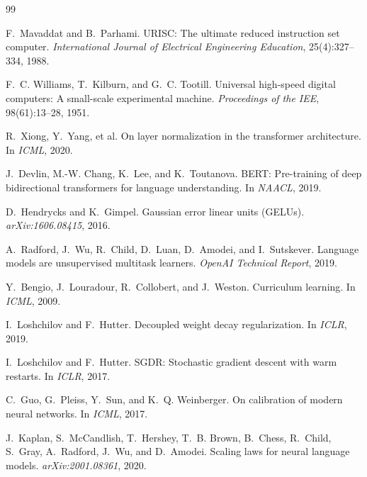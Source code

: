 \documentclass[11pt,a4paper]{article}
\begin{document}

\begin{thebibliography}{99}

F.~Mavaddat and B.~Parhami.
\newblock URISC: The ultimate reduced instruction set computer.
\newblock \emph{International Journal of Electrical Engineering Education}, 25(4):327--334, 1988.

F.~C. Williams, T.~Kilburn, and G.~C. Tootill.
\newblock Universal high-speed digital computers: A small-scale experimental machine.
\newblock \emph{Proceedings of the IEE}, 98(61):13--28, 1951.

R.~Xiong, Y.~Yang, et al.
\newblock On layer normalization in the transformer architecture.
\newblock In \emph{ICML}, 2020.

J.~Devlin, M.-W. Chang, K.~Lee, and K.~Toutanova.
\newblock BERT: Pre-training of deep bidirectional transformers for language understanding.
\newblock In \emph{NAACL}, 2019.

D.~Hendrycks and K.~Gimpel.
\newblock Gaussian error linear units (GELUs).
\newblock \emph{arXiv:1606.08415}, 2016.

A.~Radford, J.~Wu, R.~Child, D.~Luan, D.~Amodei, and I.~Sutskever.
\newblock Language models are unsupervised multitask learners.
\newblock \emph{OpenAI Technical Report}, 2019.

Y.~Bengio, J.~Louradour, R.~Collobert, and J.~Weston.
\newblock Curriculum learning.
\newblock In \emph{ICML}, 2009.

I.~Loshchilov and F.~Hutter.
\newblock Decoupled weight decay regularization.
\newblock In \emph{ICLR}, 2019.

I.~Loshchilov and F.~Hutter.
\newblock SGDR: Stochastic gradient descent with warm restarts.
\newblock In \emph{ICLR}, 2017.

C.~Guo, G.~Pleiss, Y.~Sun, and K.~Q. Weinberger.
\newblock On calibration of modern neural networks.
\newblock In \emph{ICML}, 2017.

J.~Kaplan, S.~McCandlish, T.~Hershey, T.~B. Brown, B.~Chess, R.~Child, S.~Gray, A.~Radford, J.~Wu, and D.~Amodei.
\newblock Scaling laws for neural language models.
\newblock \emph{arXiv:2001.08361}, 2020.


\end{thebibliography}
\end{document}
